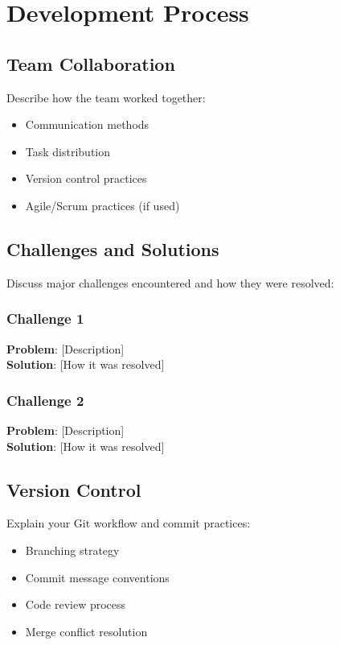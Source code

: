 \section{Development Process}

\subsection{Team Collaboration}
Describe how the team worked together:
\begin{itemize}
    \item Communication methods
    \item Task distribution
    \item Version control practices
    \item Agile/Scrum practices (if used)
\end{itemize}

\subsection{Challenges and Solutions}
Discuss major challenges encountered and how they were resolved:

\subsubsection{Challenge 1}
\textbf{Problem}: [Description]\\
\textbf{Solution}: [How it was resolved]

\subsubsection{Challenge 2}
\textbf{Problem}: [Description]\\
\textbf{Solution}: [How it was resolved]

\subsection{Version Control}
Explain your Git workflow and commit practices:
\begin{itemize}
    \item Branching strategy
    \item Commit message conventions
    \item Code review process
    \item Merge conflict resolution
\end{itemize}

